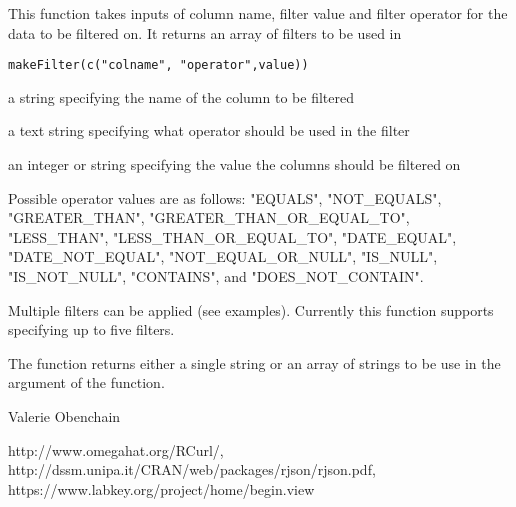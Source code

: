 \begin{Description}\relax
This function takes inputs of column name, filter value and filter operator for
the data to be filtered on. It returns an array of filters to be used in 
\end{Description}
\begin{Usage}
\begin{verbatim}
makeFilter(c("colname", "operator",value))
\end{verbatim}
\end{Usage}
\begin{Arguments}
\begin{ldescription}
\item[\code{colname}] a string specifying the name of the column to be filtered
\item[\code{operator}] a text string specifying what operator should be used in the filter
\item[\code{value}] an integer or string specifying the value the columns should be filtered on
\end{ldescription}
\end{Arguments}
\begin{Details}\relax
Possible operator values are as follows:
"EQUALS", "NOT\_EQUALS", "GREATER\_THAN", "GREATER\_THAN\_OR\_EQUAL\_TO", "LESS\_THAN",
"LESS\_THAN\_OR\_EQUAL\_TO", "DATE\_EQUAL", "DATE\_NOT\_EQUAL", "NOT\_EQUAL\_OR\_NULL",
"IS\_NULL", "IS\_NOT\_NULL", "CONTAINS", and "DOES\_NOT\_CONTAIN".

Multiple filters can be applied (see examples). Currently this function supports
specifying up to five filters.
\end{Details}
\begin{Value}
The function returns either a single string or an array of strings to be use in the
 argument of the  function.
\end{Value}
\begin{Author}\relax
Valerie Obenchain
\end{Author}
\begin{References}\relax
http://www.omegahat.org/RCurl/, 
http://dssm.unipa.it/CRAN/web/packages/rjson/rjson.pdf,
https://www.labkey.org/project/home/begin.view
\end{References}
\begin{SeeAlso}\relax
{}
\end{SeeAlso}
